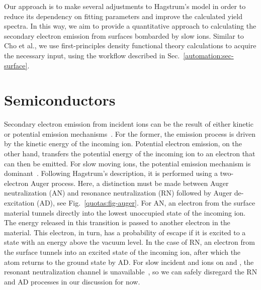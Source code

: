 \begin{refsection}
Our approach is to make several adjustments to Hagstrum's model in order to 
reduce its dependency on fitting parameters and improve the calculated yield 
spectra. In this way, we aim to provide a quantitative approach to calculating 
the secondary electron emission from surfaces bombarded by slow ions. Similar 
to Cho et al., we use first-principles density functional theory calculations 
to acquire the necessary input, using the workflow described in 
Sec.~\ref{automation:sec-surface}. 
 
\section{Semiconductors} \label{quotas:sec-see} 

Secondary electron emission from incident ions can be the result of either 
kinetic or potential emission mechanisms~\cite{Burgdorfer2007}. For the 
former, the emission process is driven by the kinetic energy of the incoming 
ion. Potential electron emission, on the other hand, transfers the potential 
energy of the incoming ion to an electron that can then be emitted.  For slow 
moving ions, the potential emission mechanism is dominant~\cite{Aumayr2007}. 
Following Hagstrum's description, it is performed using a two-electron Auger 
process. Here, a distinction must be made between Auger neutralization (AN) 
and resonance neutralization (RN) followed by Auger de-excitation (AD), see 
Fig.~\ref{quotas:fig-auger}. For AN, an electron from the surface material 
tunnels directly into the lowest unoccupied state of the incoming ion. The 
energy released in this transition is passed to another electron in the 
material. This electron, in turn, has a probability of escape if it is excited 
to a state with an energy above the vacuum level. In the case of RN, an 
electron from the surface tunnels into an excited state of the incoming ion, 
after which the atom returns to the ground state by AD. For slow incident 
 and  ions on  and , the resonant 
neutralization channel is unavailable~\cite{Hagstrum1961, Lorente1994}, so we 
can safely disregard the RN and AD processes in our discussion for now. 


\end{refsection}
